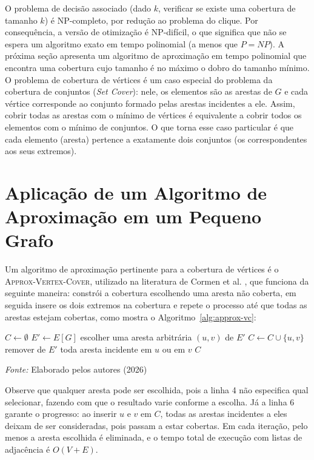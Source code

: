 O problema de decisão associado (dado $k$, verificar se existe uma cobertura de tamanho $k$) é NP-completo, por redução ao problema do clique. Por consequência, a versão de otimização é NP-difícil, o que significa que não se espera um algoritmo exato em tempo polinomial (a menos que $P = NP$). A próxima seção apresenta um algoritmo de aproximação em tempo polinomial que encontra uma cobertura cujo tamanho é no máximo o dobro do tamanho mínimo. O problema de cobertura de vértices é um caso especial do problema da cobertura de conjuntos (\textit{Set Cover}): nele, os elementos são as arestas de $G$ e cada vértice corresponde ao conjunto formado pelas arestas incidentes a ele. Assim, cobrir todas as arestas com o mínimo de vértices é equivalente a cobrir todos os elementos com o mínimo de conjuntos. O que torna esse caso particular é que cada elemento (aresta) pertence a exatamente dois conjuntos (os correspondentes aos seus extremos).

\section{Aplicação de um Algoritmo de Aproximação em um Pequeno Grafo}
Um algoritmo de aproximação pertinente para a cobertura de vértices é o \textsc{Approx-Vertex-Cover}, utilizado na literatura de Cormen et al. \cite[Seção~35.1]{cormen2012}, que funciona da seguinte maneira: constrói a cobertura escolhendo uma aresta não coberta, em seguida insere os dois extremos na cobertura e repete o processo até que todas as arestas estejam cobertas, como mostra o Algoritmo~\ref{alg:approx-vc}:

\begin{algorithm}[ht]
\caption{\textsc{Approx-Vertex-Cover}$(G)$}
\label{alg:approx-vc}
\begin{algorithmic}[1]
\STATE $C \gets \emptyset$
\STATE $E' \gets E[G]$
    \STATE escolher uma aresta arbitrária $(u,v)$ de $E'$
    \STATE $C \gets C \cup \{u,v\}$
    \STATE remover de $E'$ toda aresta incidente em $u$ ou em $v$
\ENDWHILE
\RETURN $C$
\end{algorithmic}
\footnotesize{\textit{Fonte:} Elaborado pelos autores (2026)}
\end{algorithm}

Observe que qualquer aresta pode ser escolhida, pois a linha 4 não especifica qual selecionar, fazendo com que o resultado varie conforme a escolha. Já a linha 6 garante o progresso: ao inserir $u$ e $v$ em $C$, todas as arestas incidentes a eles deixam de ser consideradas, pois passam a estar cobertas. Em cada iteração, pelo menos a aresta escolhida é eliminada, e o tempo total de execução com listas de adjacência é $O(V + E)$.

